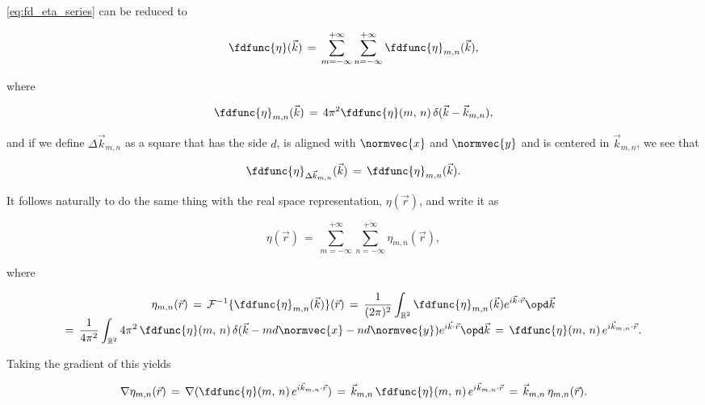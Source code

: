 {\eqref{eq:fd_eta_series} can be reduced to

\begin{equation} \label{eq:fd_eta_series_reduced}
\fdfunc{\eta}(\vec{k}) \,=\, \sum_{m=-\infty}^{+\infty}\sum_{n=-\infty}^{+\infty} \fdfunc{\eta}_{m,n}(\vec{k}),
\end{equation}

where

\begin{equation} \label{eq:fd_eta_mn_definition}
\fdfunc{\eta}_{m,n}(\vec{k}) \,=\, 4\pi^2 \fdfunc{\eta}(m,\,n)\,\delta(\vec{k} - \vec{k}_{m,n}),
\end{equation}

and if we define $\Delta\vec{k}_{m,n}$ as a square that has the side $d$, is aligned with $\normvec{x}$ and $\normvec{y}$ and is centered in $\vec{k}_{m,n}$, we see that

\begin{equation} \label{eq:fd_eta_dk_mn_definition}
\fdfunc{\eta}_{\Delta\vec{k}_{m,n}}(\vec{k}) \,=\, \fdfunc{\eta}_{m,n}(\vec{k}).
\end{equation}

It follows naturally to do the same thing with the real space representation, $\eta(\vec{r})$, and write it as

\begin{equation} \label{eq:eta_series_reduced}
\eta(\vec{r}) \,=\, \sum_{m=-\infty}^{+\infty}\sum_{n=-\infty}^{+\infty} \eta_{m,n}(\vec{r}),
\end{equation}

where

\begin{equation} \label{eq:eta_mn_definition}
\renewcommand*{\arraystretch}{1.5}
\begin{array}{c}
\displaystyle \eta_{m,n}(\vec{r}) \,=\, \mathcal{F}^{-1}\{\fdfunc{\eta}_{m,n}(\vec{k})\}(\vec{r}) \,=\, \frac{1}{(2\pi)^2} \int_{\mathbb{R}^2} \fdfunc{\eta}_{m,n}(\vec{k}) e^{i\vec{k}\cdot\vec{r}}\opd \vec{k} \\
\displaystyle =\, \frac{1}{4\pi^2} \int_{\mathbb{R}^2} 4\pi^2\,\fdfunc{\eta}(m,\,n)\,\delta(\vec{k} - md\normvec{x} - nd\normvec{y}) e^{i\vec{k}\cdot\vec{r}}\opd \vec{k} \,=\, \fdfunc{\eta}(m,\,n)\,e^{i\vec{k}_{m,n}\cdot\vec{r}}.
\end{array}
\end{equation}

Taking the gradient of this yields

\begin{equation} \label{eq:grad_eta_one_dirac}
\nabla\eta_{m,n}(\vec{r}) \,=\, \nabla(\fdfunc{\eta}(m,\,n)\,e^{i\vec{k}_{m,n}\cdot\vec{r}}) \,=\, \vec{k}_{m,n}\,\fdfunc{\eta}(m,\,n)\,e^{i\vec{k}_{m,n}\cdot\vec{r}} \,=\, \vec{k}_{m,n}\,\eta_{m,n}(\vec{r}).
\end{equation}

}
